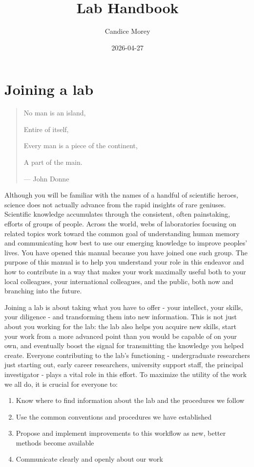\documentclass[
  12pt,
]{book}
\title{Lab Handbook}
\author{Candice Morey}
\date{2026-04-27}
\begin{document}
\maketitle

{
\setcounter{tocdepth}{1}
\tableofcontents
}
\chapter{Joining a lab}\label{joining-a-lab}

\begin{quote}
No man is an island,

Entire of itself,

Every man is a piece of the continent,

A part of the main.

--- John Donne
\end{quote}

Although you will be familiar with the names of a handful of scientific heroes, science does not actually advance from the rapid insights of rare geniuses. Scientific knowledge accumulates through the consistent, often painstaking, efforts of groups of people. Across the world, webs of laboratories focusing on related topics work toward the common goal of understanding human memory and communicating how best to use our emerging knowledge to improve peoples' lives. You have opened this manual because you have joined one such group. The purpose of this manual is to help you understand your role in this endeavor and how to contribute in a way that makes your work maximally useful both to your local colleagues, your international colleagues, and the public, both now and branching into the future.

Joining a lab is about taking what you have to offer - your intellect, your skills, your diligence - and transforming them into new information. This is not just about you working for the lab: the lab also helps you acquire new skills, start your work from a more advanced point than you would be capable of on your own, and eventually boost the signal for transmitting the knowledge you helped create. Everyone contributing to the lab's functioning - undergraduate researchers just starting out, early career researchers, university support staff, the principal investigator - plays a vital role in this effort. To maximize the utility of the work we all do, it is crucial for everyone to:

\begin{enumerate}
\def\labelenumi{\arabic{enumi}.}
\item
  Know where to find information about the lab and the procedures we follow
\item
  Use the common conventions and procedures we have established
\item
  Propose and implement improvements to this workflow as new, better methods become available
\item
  Communicate clearly and openly about our work
\end{enumerate}
\end{document}
